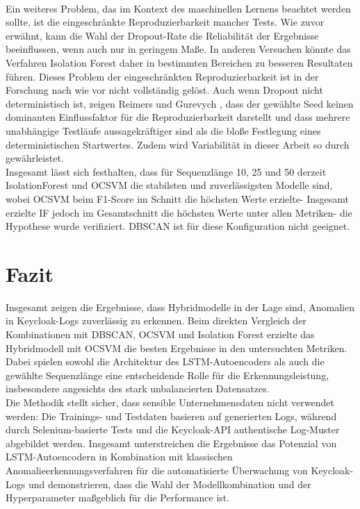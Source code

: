 \documentclass[a4paper,12pt]{article}
\begin{document}
	\\[0.5em]
	Ein weiteres Problem, das im Kontext des maschinellen Lernens beachtet werden sollte, ist die eingeschränkte Reproduzierbarkeit mancher Tests. Wie zuvor erwähnt, kann die Wahl der Dropout-Rate die Reliabilität der Ergebnisse beeinflussen, wenn auch nur in geringem Maße. In anderen Versuchen könnte das Verfahren Isolation Forest daher in bestimmten Bereichen zu besseren Resultaten führen. Dieses Problem der eingeschränkten Reproduzierbarkeit ist in der Forschung nach wie vor nicht vollständig gelöst. Auch wenn Dropout nicht deterministisch ist, zeigen Reimers und Gurevych \cite{reimers2017score}, dass der gewählte Seed keinen dominanten Einflussfaktor für die Reproduzierbarkeit darstellt und dass mehrere unabhängige Testläufe aussagekräftiger sind als die bloße Festlegung eines deterministischen Startwertes. Zudem wird Variabilität in dieser Arbeit so durch gewährleistet.
	\\[0.5em]
	Insgesamt lässt sich festhalten, dass für Sequenzlänge 10, 25 und 50 derzeit IsolationForest und OCSVM die stabilsten und zuverlässigsten Modelle sind, wobei OCSVM beim F1-Score im Schnitt die höchsten Werte erzielte- Insgesamt erzielte IF jedoch im Gesamtschnitt die höchsten Werte unter allen Metriken- die Hypothese wurde verifiziert. DBSCAN ist für diese Konfiguration nicht geeignet.
	
	\section{Fazit}
	Insgesamt zeigen die Ergebnisse, dass Hybridmodelle in der Lage sind, Anomalien in Keycloak-Logs zuverlässig zu erkennen. Beim direkten Vergleich der Kombinationen mit DBSCAN, OCSVM und Isolation Forest erzielte das Hybridmodell mit OCSVM die besten Ergebnisse in den untersuchten Metriken. Dabei spielen sowohl die Architektur des LSTM-Autoencoders als auch die gewählte Sequenzlänge eine entscheidende Rolle für die Erkennungsleistung, insbesondere angesichts des stark unbalancierten Datensatzes.
	\\[0.5em]
	Die Methodik stellt sicher, dass sensible Unternehmensdaten nicht verwendet werden: Die Trainings- und Testdaten basieren auf generierten Logs, während durch Selenium-basierte Tests und die Keycloak-API authentische Log-Muster abgebildet werden. Insgesamt unterstreichen die Ergebnisse das Potenzial von LSTM-Autoencodern in Kombination mit klassischen Anomalieerkennungsverfahren für die automatisierte Überwachung von Keycloak-Logs und demonstrieren, dass die Wahl der Modellkombination und der Hyperparameter maßgeblich für die Performance ist.
		
\end{document}
